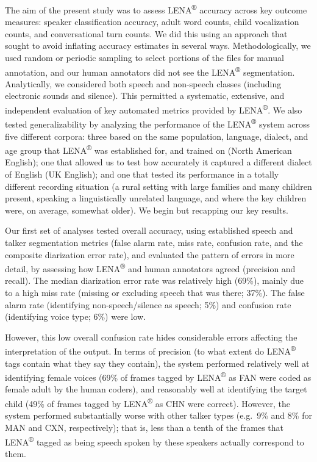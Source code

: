 \documentclass[english,floatsintext,man]{apa6}
\begin{document}
The aim of the present study was to assess LENA\textsuperscript{®}
accuracy across key outcome measures: speaker classification accuracy,
adult word counts, child vocalization counts, and conversational turn
counts. We did this using an approach that sought to avoid inflating
accuracy estimates in several ways. Methodologically, we used random or
periodic sampling to select portions of the files for manual annotation,
and our human annotators did not see the LENA\textsuperscript{®}
segmentation. Analytically, we considered both speech and non-speech
classes (including electronic sounds and silence). This permitted a
systematic, extensive, and independent evaluation of key automated
metrics provided by LENA\textsuperscript{®}. We also tested
generalizability by analyzing the performance of the
LENA\textsuperscript{®} system across five different corpora: three
based on the same population, language, dialect, and age group that
LENA\textsuperscript{®} was established for, and trained on (North
American English); one that allowed us to test how accurately it
captured a different dialect of English (UK English); and one that
tested its performance in a totally different recording situation (a
rural setting with large families and many children present, speaking a
linguistically unrelated language, and where the key children were, on
average, somewhat older). We begin but recapping our key results.

Our first set of analyses tested overall accuracy, using established
speech and talker segmentation metrics (false alarm rate, miss rate,
confusion rate, and the composite diarization error rate), and evaluated
the pattern of errors in more detail, by assessing how
LENA\textsuperscript{®} and human annotators agreed (precision and
recall). The median diarization error rate was relatively high (69\%),
mainly due to a high miss rate (missing or excluding speech that was
there; 37\%). The false alarm rate (identifying non-speech/silence as
speech; 5\%) and confusion rate (identifying voice type; 6\%) were low.

However, this low overall confusion rate hides considerable errors
affecting the interpretation of the output. In terms of precision (to
what extent do LENA\textsuperscript{®} tags contain what they say they
contain), the system performed relatively well at identifying female
voices (69\% of frames tagged by LENA\textsuperscript{®} as FAN were
coded as female adult by the human coders), and reasonably well at
identifying the target child (49\% of frames tagged by
LENA\textsuperscript{®} as CHN were correct). However, the system
performed substantially worse with other talker types (e.g.~9\% and 8\%
for MAN and CXN, respectively); that is, less than a tenth of the frames
that LENA\textsuperscript{®} tagged as being speech spoken by these
speakers actually correspond to them.
\end{document}
